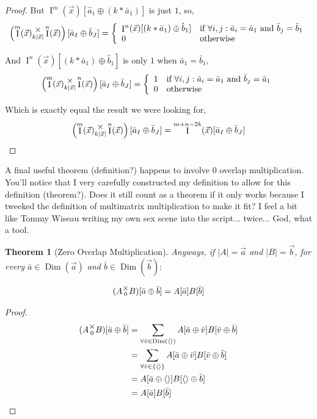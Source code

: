 \documentclass[12pt]{book}
\theoremstyle{plain}
\newtheorem{theorem}{Theorem}[chapter]
\theoremstyle{definition}
\theoremstyle{ppart}
\theoremstyle{case}
\theoremstyle{solution}
\DeclareMathOperator{\Dim}{Dim}
\DeclareMathOperator{\Ident}{I}
\newcommand{\mmult}[1]{\text{\raisebox{1ex}{$\underset{#1}{\times}$}}}
\newcommand{\shape}[1]{\left|#1\right|}
\begin{document}
\begin{landscape}
\begin{proof}
But $\Ident^m(\vec{x}) [\hat{a}_1 \oplus (k * \bar{a}_1)]$ is just $1$, so,
\[
\left( \Ident^m(\vec{x}) \mmult{k\shape{\vec{x}}} \Ident^n(\vec{x}) \right)
[\bar{a}_I \oplus \bar{b}_J] =
\left\{
  \begin{array}{ll}
    \Ident^n(\vec{x}) [(k * \bar{a}_1) \oplus \hat{b}_1]
    & \mbox{if } \forall i, j : \bar{a}_i = \bar{a}_1 \mbox{ and } \bar{b}_j = \bar{b}_1 \\
    0 & \mbox{otherwise}
  \end{array}
\right.
\]

And $\Ident^n(\vec{x}) [(k * \bar{a}_1) \oplus \hat{b}_1]$ is only $1$ when $\bar{a}_1 = \bar{b}_1$,
\[
\left( \Ident^m(\vec{x}) \mmult{k\shape{\vec{x}}} \Ident^n(\vec{x}) \right)
[\bar{a}_I \oplus \bar{b}_J] =
\left\{
  \begin{array}{ll}
    1 & \mbox{if } \forall i, j : \bar{a}_i = \bar{a}_1 \mbox{ and } \bar{b}_j = \bar{a}_1 \\
    0 & \mbox{otherwise}
  \end{array}
\right.
\]

Which is exactly equal the result we were looking for,
\[
  \left( \Ident^m(\vec{x}) \mmult{k\shape{\vec{x}}} \Ident^n(\vec{x}) \right) [\bar{a}_I \oplus \bar{b}_J]
  = \Ident^{m+n-2k}(\vec{x}) [\bar{a}_I \oplus \bar{b}_J]
\]
\end{proof}
\end{landscape}


A final useful theorem (definition?) happens to involve 0 overlap multiplication.
You'll notice that I very carefully constructed my definition to allow for this
definition (theorem?). Does it still count as a theorem if it only works because
I tweeked the definition of multimatrix multiplication to make it fit? I feel
a bit like Tommy Wiseau writing my own sex scene into the script... twice... God,
what a tool.

\begin{theorem}[Zero Overlap Multiplication]
Anyways, if $\shape{A} = \vec{a}$ and $\shape{B} = \vec{b}$, for every $\bar{a} \in \Dim(\vec{a})$
and $\bar{b} \in \Dim(\vec{b}):$

\[ (A \mmult{0} B)[\bar{a} \oplus \bar{b}] = A[\bar{a}] B[\bar{b}] \]

\end{theorem}
\begin{proof}
\begin{align*}
	(A \mmult{0} B)[\bar{a} \oplus \bar{b}]
	&=
	\sum_{\forall \bar{v} \in \Dim(\left<\right>)}
	A[\bar{a} \oplus \bar{v}] B[\bar{v} \oplus \bar{b}] \\
	&=
	\sum_{\forall \bar{v} \in \left\{\left<\right>\right\}}
	A[\bar{a} \oplus \bar{v}] B[\bar{v} \oplus \bar{b}] \\
	&=
	A[\bar{a} \oplus \left<\right>] B[\left<\right> \oplus \bar{b}] \\
	&=
	A[\bar{a}] B[\bar{b}] \\
\end{align*}
\end{proof}
\end{document}
